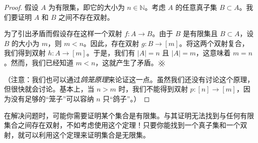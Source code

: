 \begin{proof}
    假设 $A$ 为有限集，即它的大小为 $n \in \mathbb{N}$。考虑 $A$ 的任意真子集 $B \subset A$。我们要证明 $A$ 和 $B$ 之间不存在双射。

    为了引出矛盾而假设存在这样一个双射 $f : A \to B$。由于 $B$ 是有限集且 $B \subset A$，设 $B$ 的大小为 $m$，则 $m < n$。因此，存在双射 $g : B \to [m]$。将这两个双射复合，我们得到双射 $h : A \to [m]$。于是，我们有 $|A| = n$ 且 $|A| = m$，这意味着 $m = n$。然而，我们已经知道 $m < n$，这就产生了矛盾。$\hashx$

    （注意：我们也可以通过\emph{鸽笼原理}来论证这一点。虽然我们还没有讨论这个原理，但很快就会讨论。基本上，当 $n > m$ 时，我们不能得到双射 $p:[n] \to [m]$，因为没有足够的``笼子''可以容纳 $n$ 只``鸽子''。）
\end{proof}

在解决问题时，可能你需要证明某个集合是有限集。与其证明无法找到与任何有限集合之间存在双射，不如考虑使用这个定理！只要你能找到一个真子集和一个双射，就可以利用这个定理来证明集合是无限集。
